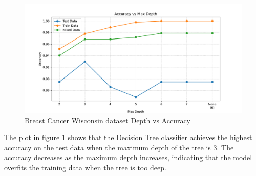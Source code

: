 \begin{figure}[H]
    \centering
    \includegraphics[width=\textwidth]{figures/breast_cancer_wisconsin_accuracy_vs_max_depth.pdf}
    \caption{Breast Cancer Wisconsin dataset Depth vs Accuracy}
    \label{fig:breast_cancer_wisconsin_depth_vs_accuracy}
\end{figure}

The plot in figure \ref{fig:breast_cancer_wisconsin_depth_vs_accuracy} shows that the Decision Tree classifier achieves the highest accuracy on the test data
when the maximum depth of the tree is 3. The accuracy decreases as the maximum depth increases, indicating that the model overfits the training data when the tree is too deep.

